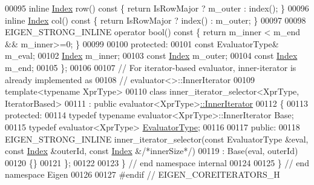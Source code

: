 \begin{DoxyCode}
00095   \textcolor{keyword}{inline} \hyperlink{namespace_eigen_a62e77e0933482dafde8fe197d9a2cfde}{Index} row()\textcolor{keyword}{ const }\{ \textcolor{keywordflow}{return} IsRowMajor ? m\_outer : index(); \}
00096   \textcolor{keyword}{inline} \hyperlink{namespace_eigen_a62e77e0933482dafde8fe197d9a2cfde}{Index} col()\textcolor{keyword}{ const }\{ \textcolor{keywordflow}{return} IsRowMajor ? index() : m\_outer; \}
00097 
00098   EIGEN\_STRONG\_INLINE \textcolor{keyword}{operator} bool()\textcolor{keyword}{ const }\{ \textcolor{keywordflow}{return} m\_inner < m\_end && m\_inner>=0; \}
00099 
00100 \textcolor{keyword}{protected}:
00101   \textcolor{keyword}{const} EvaluatorType& m\_eval;
00102   \hyperlink{namespace_eigen_a62e77e0933482dafde8fe197d9a2cfde}{Index} m\_inner;
00103   \textcolor{keyword}{const} \hyperlink{namespace_eigen_a62e77e0933482dafde8fe197d9a2cfde}{Index} m\_outer;
00104   \textcolor{keyword}{const} \hyperlink{namespace_eigen_a62e77e0933482dafde8fe197d9a2cfde}{Index} m\_end;
00105 \};
00106 
00107 \textcolor{comment}{// For iterator-based evaluator, inner-iterator is already implemented as}
00108 \textcolor{comment}{// evaluator<>::InnerIterator}
00109 \textcolor{keyword}{template}<\textcolor{keyword}{typename} XprType>
00110 \textcolor{keyword}{class }inner\_iterator\_selector<XprType, IteratorBased>
00111  : \textcolor{keyword}{public} evaluator<XprType>\hyperlink{class_eigen_1_1_inner_iterator}{::InnerIterator}
00112 \{
00113 \textcolor{keyword}{protected}:
00114   \textcolor{keyword}{typedef} \textcolor{keyword}{typename} evaluator<XprType>::InnerIterator Base;
00115   \textcolor{keyword}{typedef} evaluator<XprType> \hyperlink{struct_eigen_1_1internal_1_1evaluator}{EvaluatorType};
00116   
00117 \textcolor{keyword}{public}:
00118   EIGEN\_STRONG\_INLINE inner\_iterator\_selector(\textcolor{keyword}{const} EvaluatorType &eval, \textcolor{keyword}{const} 
      \hyperlink{namespace_eigen_a62e77e0933482dafde8fe197d9a2cfde}{Index} &outerId, \textcolor{keyword}{const} \hyperlink{namespace_eigen_a62e77e0933482dafde8fe197d9a2cfde}{Index} &\textcolor{comment}{/*innerSize*/})
00119     : Base(eval, outerId)
00120   \{\}  
00121 \};
00122 
00123 \} \textcolor{comment}{// end namespace internal}
00124 
00125 \} \textcolor{comment}{// end namespace Eigen}
00126 
00127 \textcolor{preprocessor}{#endif // EIGEN\_COREITERATORS\_H}
\end{DoxyCode}
